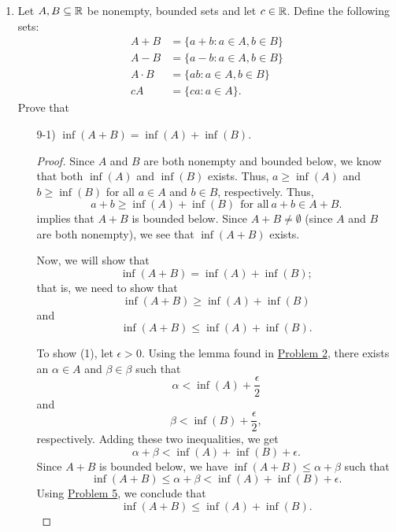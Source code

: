 \documentclass[11pt,a4paper]{article}
\begin{document}
\begin{enumerate}
\item Let \( A, B \subseteq \mathbb{R}  \) be nonempty, bounded sets and let \( c \in \mathbb{R}  \). Define the following sets:
    \begin{align*}
        A + B &= \{ a + b : a \in A, b \in B \}  \\
        A - B &= \{ a - b : a \in A , b \in B  \}  \\
        A \cdot B &= \{ ab : a \in A, b \in B \} \\
        cA &= \{ ca: a \in A \}.
    \end{align*}
    Prove that 
    \begin{enumerate}
        \item[9-1)] \( \inf(A + B) = \inf(A) + \inf(B) \).
            \begin{proof}
                Since \( A  \) and \( B  \) are both nonempty and bounded below, we know that both \( \inf(A) \) and \( \inf(B) \) exists. Thus, \( a \geq \inf(A) \) and \( b \geq \inf(B) \) for all \( a \in A  \) and \( b \in B  \), respectively. Thus, 
                \[  a + b \geq \inf(A) + \inf(B) \ \ \text{for all} \ a + b \in A + B. \]
                implies that \( A + B  \) is bounded below. Since \( A + B \neq \emptyset  \) (since \( A  \) and \( B  \) are both nonempty), we see that \( \inf(A+B)  \) exists.

                Now, we will show that 
                \[  \inf(A+B) = \inf(A) + \inf(B);  \]
                that is, we need to show that 
                \[  \inf(A+B) \geq \inf(A) + \inf(B) \tag{1}  \]
                and 
                \[  \inf(A+B) \leq \inf(A) + \inf(B). \tag{2} \]

                To show (1), let \( \epsilon > 0 \). Using the lemma found in {\hyperref[Problem 2]{Problem 2}}, there exists an \( \alpha \in A  \) and \( \beta \in \beta  \) such that 
                \[  \alpha < \inf(A) + \frac{ \epsilon }{ 2 } \]
                and
                \[  \beta < \inf(B) + \frac{ \epsilon }{ 2 },  \]
                respectively. Adding these two inequalities, we get
                \[  \alpha + \beta < \inf(A) + \inf(B) + \epsilon. \]
                Since \( A + B  \) is bounded below, we have \( \inf(A+B) \leq \alpha + \beta  \) such that 
                \[  \inf(A+B) \leq \alpha + \beta < \inf(A) + \inf(B) + \epsilon. \]
                Using {\hyperref[Problem 5]{Problem 5}}, we conclude that   
                \[  \inf(A+B) \leq \inf(A) + \inf(B). \]


\end{proof}
\end{enumerate}
\end{enumerate}
\end{document}
